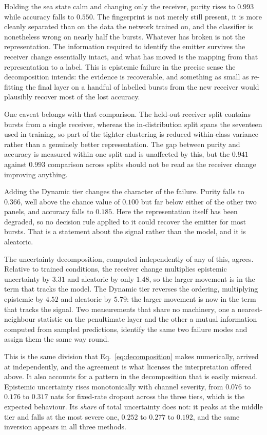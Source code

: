 \documentclass{article}
\begin{document}
Holding the sea state calm and changing only the receiver, purity rises to
$0.993$ while accuracy falls to $0.550$. The fingerprint is not merely still
present, it is more cleanly separated than on the data the network trained on,
and the classifier is nonetheless wrong on nearly half the bursts. Whatever has
broken is not the representation. The information required to identify the
emitter survives the receiver change essentially intact, and what has moved is
the mapping from that representation to a label. This is epistemic failure in
the precise sense the decomposition intends: the evidence is recoverable, and
something as small as re-fitting the final layer on a handful of labelled bursts
from the new receiver would plausibly recover most of the lost accuracy.

One caveat belongs with that comparison. The held-out receiver split contains
bursts from a single receiver, whereas the in-distribution split spans the
seventeen used in training, so part of the tighter clustering is reduced
within-class variance rather than a genuinely better representation. The gap
between purity and accuracy is measured within one split and is unaffected by
this, but the $0.941$ against $0.993$ comparison across splits should not be
read as the receiver change improving anything.

Adding the Dynamic tier changes the character of the failure. Purity falls to
$0.366$, well above the chance value of $0.100$ but far below either of the
other two panels, and accuracy falls to $0.185$. Here the representation itself
has been degraded, so no decision rule applied to it could recover the emitter
for most bursts. That is a statement about the signal rather than the model, and
it is aleatoric.

The uncertainty decomposition, computed independently of any of this, agrees.
Relative to trained conditions, the receiver change multiplies epistemic
uncertainty by $3.31$ and aleatoric by only $1.48$, so the larger movement is in
the term that tracks the model. The Dynamic tier reverses the ordering,
multiplying epistemic by $4.52$ and aleatoric by $5.79$: the larger movement is
now in the term that tracks the signal. Two measurements that share no
machinery, one a nearest-neighbour statistic on the penultimate layer and the
other a mutual information computed from sampled predictions, identify the same
two failure modes and assign them the same way round.

This is the same division that Eq.~\eqref{eq:decomposition} makes numerically,
arrived at independently, and the agreement is what licenses the interpretation
offered above. It also accounts for a pattern in the decomposition that is
easily misread. Epistemic uncertainty rises monotonically with channel
severity, from $0.076$ to $0.176$ to $0.317$ nats for fixed-rate dropout across
the three tiers, which is the expected behaviour. Its \emph{share} of total
uncertainty does not: it peaks at the middle tier and falls at the most severe
one, $0.252$ to $0.277$ to $0.192$, and the same inversion appears in all three
methods.
\end{document}
